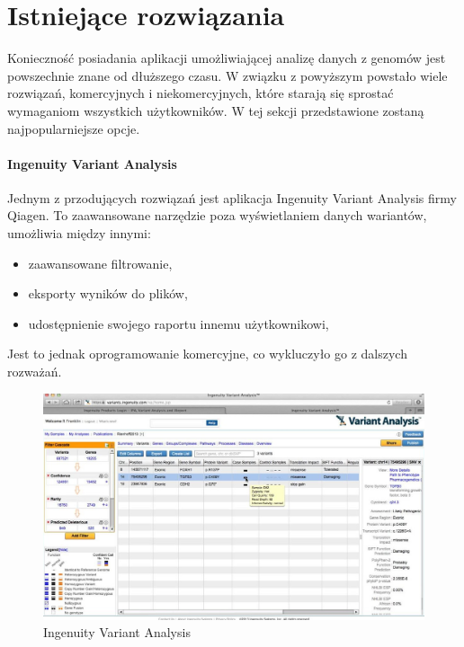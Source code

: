 \documentclass[a4paper,12pt,twoside]{article}
\begin{document}
\newpage
\section{Istniejące rozwiązania}  

Konieczność posiadania aplikacji umożliwiającej analizę danych z genomów 
jest powszechnie znane od dłuższego czasu. W związku z powyższym 
powstało wiele rozwiązań,
komercyjnych i niekomercyjnych, które starają się sprostać wymaganiom wszystkich użytkowników. W tej sekcji przedstawione zostaną najpopularniejsze opcje.

\paragraph{Ingenuity Variant Analysis} Jednym z przodujących rozwiązań jest aplikacja Ingenuity Variant Analysis \cite{ingenuity} firmy Qiagen. To zaawansowane narzędzie
poza wyświetlaniem danych wariantów, umożliwia między innymi:

\begin{itemize}
\item zaawansowane filtrowanie,
\item eksporty wyników do plików,
\item udostępnienie swojego raportu innemu użytkownikowi,
\end{itemize} 
  
Jest to jednak oprogramowanie komercyjne, co wykluczyło go z dalszych 
rozważań.

\begin{figure}[h]
\includegraphics[width=\linewidth]{obrazy/exac/ingenuity.jpg}
  \caption{Ingenuity Variant Analysis \cite{ingenuity}}
  \label{fig:ingenuitypic}
\end{figure}
\newpage
\end{document}
